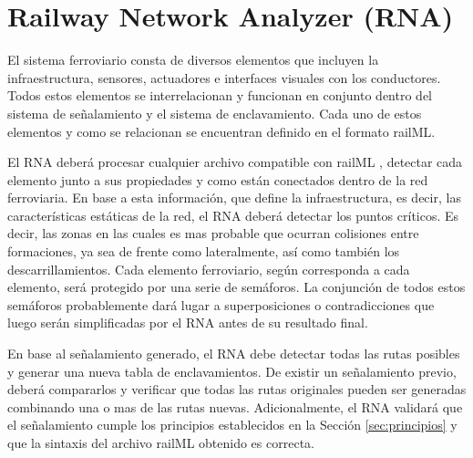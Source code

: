 \chapter{Railway Network Analyzer (RNA)}
    \label{sec:RNA}

    El sistema ferroviario consta de diversos elementos que incluyen la infraestructura, sensores, actuadores  e interfaces visuales con los conductores. Todos estos elementos se interrelacionan y funcionan en conjunto dentro del sistema de señalamiento y el sistema de enclavamiento. Cada uno de estos elementos y como se relacionan se encuentran definido en el formato railML. 

    El RNA deberá procesar cualquier archivo compatible con railML \cite{RAILML_0,Paper_109,Paper_107,Paper_112,Paper_150,Paper_159}, detectar cada elemento junto a sus propiedades y como están conectados dentro de la red ferroviaria. En base a esta información, que define la infraestructura, es decir, las características estáticas de la red, el RNA deberá detectar los puntos críticos. Es decir, las zonas en las cuales es mas probable que ocurran colisiones entre formaciones, ya sea de frente como lateralmente, así como también los descarrillamientos. Cada elemento ferroviario, según corresponda a cada elemento, será protegido por una serie de semáforos. La conjunción de todos estos semáforos probablemente dará lugar a superposiciones o contradicciones que luego serán simplificadas por el RNA antes de su resultado final.

    En base al señalamiento generado, el RNA debe detectar todas las rutas posibles y generar una nueva tabla de enclavamientos. De existir un señalamiento previo, deberá compararlos y verificar que todas las rutas originales pueden ser generadas combinando una o mas de las rutas nuevas. Adicionalmente, el RNA validará que el señalamiento cumple los principios establecidos en la Sección \ref{sec:principios} y que la sintaxis del archivo railML obtenido es correcta.    

    
    
    
    
    
    